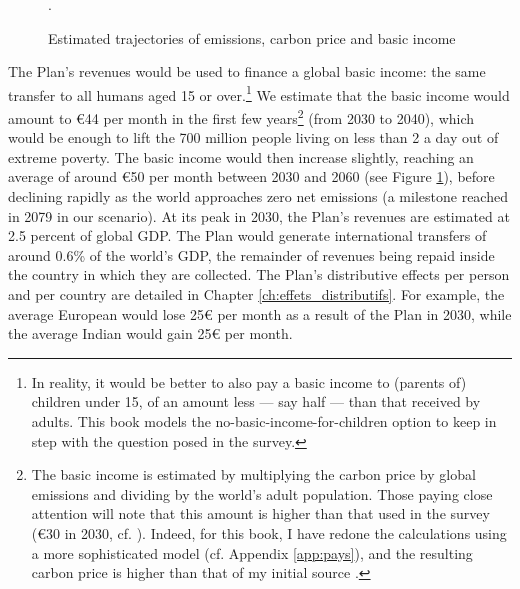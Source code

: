 \documentclass[a5paper,english,openany]{memoir}
\begin{document}
\begin{figure}[bh!]
  \caption[Trajectories (emissions, price, basic income)]{Estimated trajectories of emissions, carbon price and basic income}.\label{fig:trajectory}
\end{figure} 

The Plan's revenues would be used to finance a global basic income: the same transfer to all humans aged 15 or over.\footnote{In reality, it would be better to also pay a basic income to (parents of) children under 15, of an amount less --- say half --- than that received by adults. This book models the no-basic-income-for-children option to keep in step with the question posed in the survey.
} 
We estimate that the basic income would amount to \euro{}44 per month in the first few years\footnote{The basic income is estimated by multiplying the carbon price by global emissions and dividing by the world's adult population. Those paying close attention will note that this amount is higher than that used in the survey (\euro{}30 in 2030, cf. \citealp{fabre_global_2023}). Indeed, for this book, I have redone the calculations using a more sophisticated model (cf. Appendix \ref{app:pays}), and the resulting carbon price is higher than that of my initial source \citep{stern_report_2017}.} (from 2030 to 2040), which would be enough to lift the 700 million people living on less than \textit{\texteuro{}}2 a day out of extreme poverty. 
The basic income would then increase slightly, reaching an average of around \euro{}50 per month between 2030 and 2060 (see Figure \ref{fig:trajectory}), before declining rapidly as the world approaches zero net emissions (a milestone reached in 2079 in our scenario). 
At its peak in 2030, the Plan's revenues are estimated at 2.5 percent of global GDP. The Plan would generate international transfers of around 0.6\% %
of the world's GDP, the remainder %
of revenues being repaid inside the country in which they are collected. 
The Plan's distributive effects per person and per country are detailed in Chapter \ref{ch:effets_distributifs}. 
For example, the average European %
would lose 25\euro{} per month as a result of the Plan in 2030, while the average Indian would gain 25\euro{} per month. %
\end{document}
